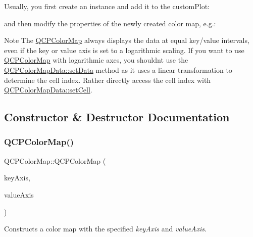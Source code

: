 Usually, you first create an instance and add it to the custom\+Plot\+: 
\begin{DoxyCodeInclude}
\end{DoxyCodeInclude}
and then modify the properties of the newly created color map, e.\+g.\+: 
\begin{DoxyCodeInclude}
\end{DoxyCodeInclude}
 \begin{DoxyNote}{Note}
The \mbox{\hyperlink{class_q_c_p_color_map}{Q\+C\+P\+Color\+Map}} always displays the data at equal key/value intervals, even if the key or value axis is set to a logarithmic scaling. If you want to use \mbox{\hyperlink{class_q_c_p_color_map}{Q\+C\+P\+Color\+Map}} with logarithmic axes, you shouldn\textquotesingle{}t use the \mbox{\hyperlink{class_q_c_p_color_map_data_afd2083ccfd6987ec94aa7ef8e91ca39a}{Q\+C\+P\+Color\+Map\+Data\+::set\+Data}} method as it uses a linear transformation to determine the cell index. Rather directly access the cell index with \mbox{\hyperlink{class_q_c_p_color_map_data_a8e75eaf8746596319032a93f3d2d0683}{Q\+C\+P\+Color\+Map\+Data\+::set\+Cell}}. 
\end{DoxyNote}


\subsection{Constructor \& Destructor Documentation}
\mbox{\label{class_q_c_p_color_map_aa37e976d2ee1e2be6c4cd88a64b36215}} 
\subsubsection{\texorpdfstring{Q\+C\+P\+Color\+Map()}{QCPColorMap()}}
{\footnotesize\ttfamily Q\+C\+P\+Color\+Map\+::\+Q\+C\+P\+Color\+Map (\begin{DoxyParamCaption}\item[{\mbox{\hyperlink{class_q_c_p_axis}{Q\+C\+P\+Axis}} $\ast$}]{key\+Axis,  }\item[{\mbox{\hyperlink{class_q_c_p_axis}{Q\+C\+P\+Axis}} $\ast$}]{value\+Axis }\end{DoxyParamCaption})\hspace{0.3cm}{\ttfamily [explicit]}}

Constructs a color map with the specified {\itshape key\+Axis} and {\itshape value\+Axis}.

